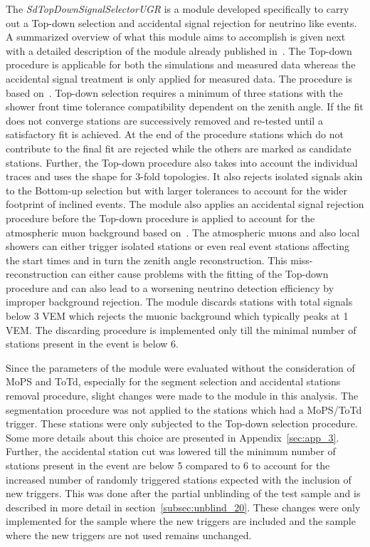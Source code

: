 The \textit{SdTopDownSignalSelectorUGR} is a module developed specifically to carry out a Top-down selection and accidental signal rejection for neutrino like events. A summarized overview of what this module aims to accomplish is given next with a detailed description of the module already published in~\cite{gap_top_down_module}. The Top-down procedure is applicable for both the simulations and measured data whereas the accidental signal treatment is only applied for measured data. The procedure is based on~\cite{gap_top_down_proc}. Top-down selection requires a minimum of three stations with the shower front time tolerance compatibility dependent on the zenith angle. If the fit does not converge stations are successively removed and re-tested until a satisfactory fit is achieved. At the end of the procedure stations which do not contribute to the final fit are rejected while the others are marked as candidate stations. Further, the Top-down procedure also takes into account the individual traces and uses the shape for 3-fold topologies. It also rejects isolated signals akin to the Bottom-up selection but with larger tolerances to account for the wider footprint of inclined events. The module also applies an accidental signal rejection procedure before the Top-down procedure is applied to account for the atmospheric muon background based on~\cite{gap_segment_selection}. The atmospheric muons and also local showers can either trigger isolated stations or even real event stations affecting the start times and in turn the zenith angle reconstruction. This miss-reconstruction can either cause problems with the fitting of the Top-down procedure and can also lead to a worsening neutrino detection efficiency by improper background rejection. The module discards stations with total signals below 3 VEM which rejects the muonic background which typically peaks at 1 VEM. The discarding procedure is implemented only till the minimal number of stations present in the event is below 6.

Since the parameters of the module were evaluated without the consideration of MoPS and ToTd, especially for the segment selection and accidental stations removal procedure, slight changes were made to the module in this analysis. The segmentation procedure was not applied to the stations which had a MoPS/ToTd trigger. These stations were only subjected to the Top-down selection procedure. Some more details about this choice are presented in Appendix~\ref{sec:app_3}. Further, the accidental station cut was lowered till the minimum number of stations present in the event are below 5 compared to 6 to account for the increased number of randomly triggered stations expected with the inclusion of new triggers. This was done after the partial unblinding of the test sample and is described in more detail in section~\ref{subsec:unblind_20}. These changes were only implemented for the sample where the new triggers are included and the sample where the new triggers are not used remains unchanged. 

